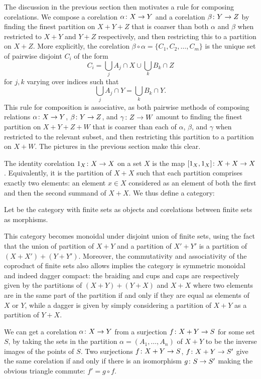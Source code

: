 The discussion in the previous section then motivates a rule for composing corelations. We compose a corelation $\alpha {\colon} X \to Y$ and a corelation $\beta {\colon} Y \to Z$ by finding the finest partition on $X+Y+Z$ that is coarser than both $\alpha$ and $\beta$ when restricted to $X+Y$ and $Y+Z$ respectively, and then restricting this to a
partition on $X+Z$. More explicitly, the corelation $\beta\circ\alpha = \{C_1,
C_2, \dots, C_m\}$ is the unique set of pairwise disjoint $C_i$ of the form 
\[
  C_i = \bigcup_j A_j \cap X \cup \bigcup_k B_k \cap Z
\]
for $j,k$ varying over indices such that 
\[
  \bigcup_j A_j \cap Y = \bigcup_k B_k \cap Y.
\]
This rule for composition is associative, as both pairwise methods of composing relations
$\alpha{\colon} X \to Y$, $\beta{\colon} Y \to Z$, and $\gamma{\colon} Z \to W$ amount to finding the finest partition on $X+Y+Z+W$ that is coarser than each of $\alpha$, $\beta$, and $\gamma$ when restricted to the relevant subset, and then restricting this
partition to a partition on $X+W$.  The pictures in the previous section make this clear.

The identity corelation $1_X{\colon} X \to X$ on a set $X$ is the map $[1_X,1_X]{\colon} X+X \to X$. Equivalently, it is the partition of $X+X$ such that each partition
comprises exactly two elements: an element $x \in X$ considered as an element of
both the first and then the second summand of $X+X$. We thus define a category:

\begin{definition}
  Let  be the category with finite sets as objects and
  corelations between finite sets as morphisms. 
\end{definition}

This category becomes monoidal under disjoint union of finite sets, using the
fact that the union of partition of $X + Y$ and a partition of $X' + Y'$ is a
partition of $(X+X') + (Y+Y')$. Moreover, the commutativity and associativity of
the coproduct of finite sets also allows implies the category is symmetric
monoidal and indeed dagger compact: the braiding and cups and caps are
respectively given by the partitions of $(X+Y)+(Y+X)$ and $X+X$ where two
elements are in the same part of the partition if and only if they are equal as
elements of $X$ or $Y$, while a dagger is given by simply considering a
partition of $X+Y$ as a partition of $Y+X$.

We can get a corelation $\alpha {\colon} X \to Y$ from a surjection $f {\colon} X + Y
\to S$ for some set $S$, by taking the sets in the partition $\alpha = (A_1,
\dots, A_n)$ of $X+Y$ to be the inverse images of the points of $S$.  Two
surjections $f {\colon} X + Y \to S$, $f {\colon} X + Y \to S'$ give the same
corelation if and only if there is an isomorphism $g {\colon} S \to S'$ making the
obvious triangle commute: $f' = g \circ f$.


